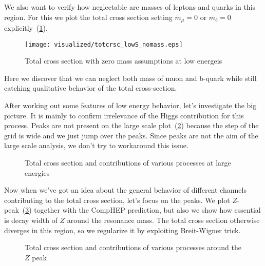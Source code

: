 \documentclass{article}
\begin{document}
We also want to verify how neglectable are masses of leptons and quarks in this region. For this we plot the total cross section setting $m_\mu = 0$ or $m_b = 0$ explicitly~(\cref{fig:totcrsc_lowS_nomass}).

\begin{figure}[H]
    \centering
    \texttt{[image: visualized/totcrsc\_lowS\_nomass.eps]}
    \caption{Total cross section with zero mass assumptions at low energeis}%
    \label{fig:totcrsc_lowS_nomass}
\end{figure}

Here we discover that we can neglect both mass of muon and b-quark while still catching qualitative behavior of the total cross-section.

After working out some features of low energy behavior, let's investigate the big picture. It is mainly to confirm irrelevance of the Higgs contribution for this process. Peaks are not present on the large scale plot~(\cref{fig:totcrsc_tail}) because the step of the grid is wide and we just jump over the peaks. Since peaks are not the aim of the large scale analysis, we don't try to workaround this issue.

\begin{figure}[H]
    \centering
    \hfill%
    \caption{Total cross section and contributions of various processes at large energies}%
    \label{fig:totcrsc_tail}
\end{figure}

Now when we've got an idea about the general behavior of different channels contributing to the total cross section, let's focus on the peaks. We plot $Z$-peak~(\ref{fig:totcrsc_Zpeak}) together with the CompHEP prediction, but also we show how essential is decay width of $Z$ around the resonance mass. The total cross section otherwise diverges in this region, so we regularize it by exploiting Breit-Wigner trick.

\begin{figure}[H]
    \centering
    \hfill%
    \caption{Total cross section and contributions of various processes around the $Z$ peak}%
    \label{fig:totcrsc_Zpeak}
\end{figure}
\end{document}
